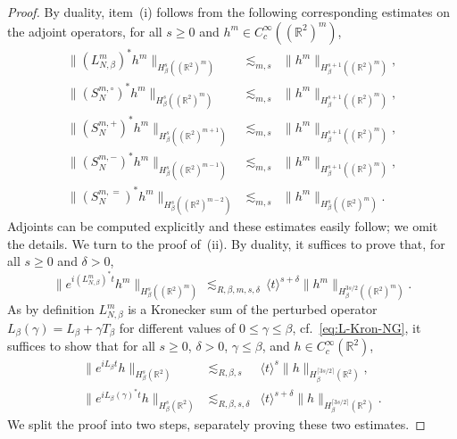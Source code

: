 \documentclass[a4paper,11pt,reqno,noindent]{amsart}
\theoremstyle{plain}
\numberwithin{equation}{section}
\newcommand{\R}{\mathbb R}
\newcommand{\3}{|\!|\!|}
\begin{document}
\begin{proof}
By duality, item~(i) follows from the following corresponding estimates on the adjoint operators, for all $s\ge0$ and $h^m\in C^\infty_c((\R^2)^m)$,
\begin{eqnarray*}
\|(L^{m}_{N,\beta})^*h^{m}\|_{H^{s}_\beta((\R^2)^m)}&\lesssim_{m,s}&\|h^{m}\|_{H^{s+1}_\beta((\R^2)^{m})},\\
\|(S^{m,\circ}_N)^*h^{m}\|_{H^{s}_\beta((\R^2)^m)}&\lesssim_{m,s}&\|h^{m}\|_{H^{s+1}_\beta((\R^2)^{m})},\\
\|(S^{m,+}_N)^*h^m\|_{H^{s}_\beta((\R^2)^{m+1})}&\lesssim_{m,s}&\|h^{m}\|_{H^{s+1}_\beta((\R^2)^{m})},\\
\|(S^{m,-}_N)^*h^{m}\|_{H^{s}_\beta((\R^2)^{m-1})}&\lesssim_{m,s}&\|h^{m}\|_{H^{s+1}_\beta((\R^2)^{m})},\\
\|(S^{m,=}_N)^*h^{m}\|_{H^{s}_\beta((\R^2)^{m-2})}&\lesssim_{m,s}&\|h^{m}\|_{H^{s}_\beta((\R^2)^{m})}.
\end{eqnarray*}
Adjoints can be computed explicitly and these estimates easily follow; we omit the details.
We turn to the proof of~(ii).
By duality, it suffices to prove that, for all $s\ge0$ and $\delta>0$,
\[\|e^{i(L_{N,\beta}^m)^*t}h^m\|_{H^{s}_\beta((\R^2)^m)}\,\lesssim_{R,\beta,m,s,\delta}\,\langle t\rangle^{s+\delta}\|h^m\|_{H^{3s/2}_\beta((\R^2)^m)}.\]
As by definition $L_{N,\beta}^m$ is a Kronecker sum of the perturbed operator $L_\beta(\gamma)=L_\beta+\gamma T_\beta$ for different values of $0\le\gamma\le\beta$, cf.~\eqref{eq:L-Kron-NG}, it suffices to show that for all $s\ge0$, $\delta>0$, $\gamma\le\beta$, and $h\in C^\infty_c(\R^2)$,
\begin{eqnarray}
\|e^{iL_\beta t}h\|_{H^{s}_\beta(\R^2)}&\lesssim_{R,\beta,s}&\langle t\rangle^{s}\|h\|_{H^{\lceil3s/2\rceil}_\beta(\R^2)},\label{eq:estimHs-Lbeta-1}\\
\|e^{iL_\beta(\gamma)^*t}h\|_{H^{s}_\beta(\R^2)}&\lesssim_{R,\beta,s,\delta}&\langle t\rangle^{s+\delta}\|h\|_{H^{\lceil3s/2\rceil}_\beta(\R^2)}.\label{eq:estimHs-Lbeta-2}
\end{eqnarray}
We split the proof into two steps, separately proving these two estimates.


\end{proof}
\end{document}
